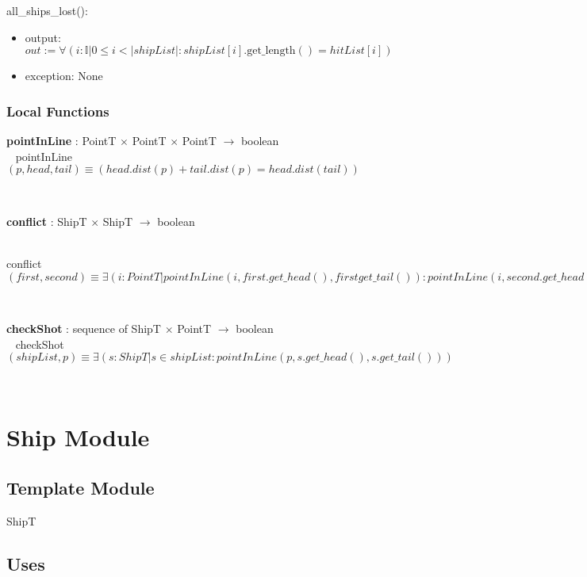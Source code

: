 \documentclass[12pt]{article}
\begin{document}
\noindent all\_ships\_lost():
\begin{itemize}
\item output: $out := \forall( i : \mathbb{I} | 0 \leq i < |shipList| : shipList[i].\mbox{get\_length}() = hitList[i])$
\item exception: None
\end{itemize}


\subsubsection* {Local Functions}

\textbf{pointInLine} : PointT $\times$ PointT $\times$ PointT $\rightarrow$ boolean\\
~\newline
pointInLine$(p, head, tail) \equiv (head.dist(p) + tail.dist(p) = head.dist(tail))$

~\newline

\noindent \textbf{conflict} : ShipT $\times$ ShipT $\rightarrow$ boolean\\
~\newline

conflict$(first, second) \equiv \exists( i :PointT | pointInLine(i, first.get\_head(), firstget\_tail()) :pointInLine(i, second.get\_head(), second.get\_tail()) \rightarrow hitIndex = index_of_i )$

~\newline

\noindent \textbf{checkShot} : sequence of ShipT $\times$ PointT $\rightarrow$ boolean\\
~\newline
checkShot$(shipList, p) \equiv \exists( s : ShipT | s \in shipList : pointInLine(p, s.get\_head(), s.get\_tail()))$

~\newline

\section* {Ship Module}

\subsection* {Template Module}

ShipT

\subsection* {Uses}
\end{document}
